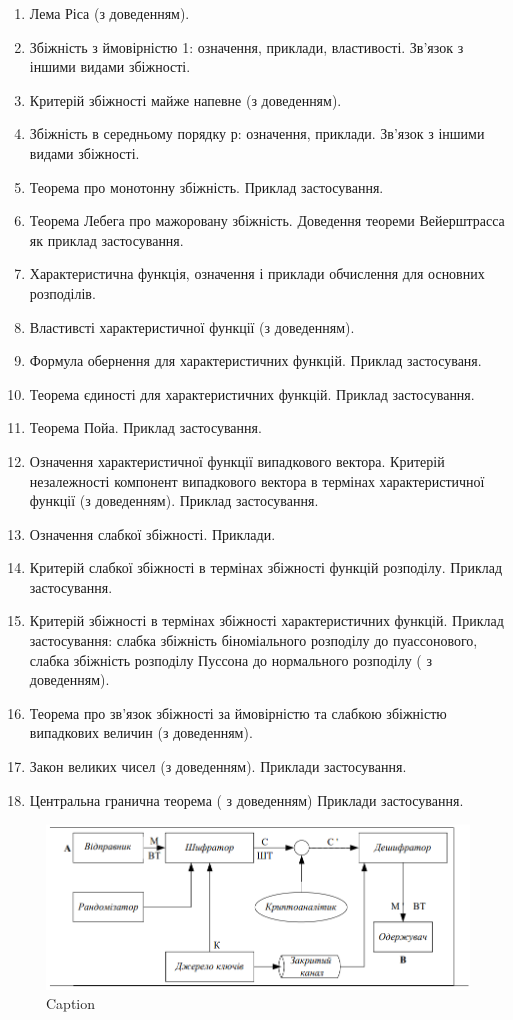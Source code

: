 \begin{enumerate}
    \item Лема Ріса (з доведенням).
    \item Збіжність з ймовірністю 1: означення, приклади, властивості. Зв'язок з іншими
        видами збіжності.
    \item Критерій збіжності майже напевне (з доведенням).
    \item Збіжність в середньому порядку р: означення, приклади. Зв'язок з іншими видами
        збіжності.
    \item Теорема про монотонну збіжність. Приклад застосування.
    \item Теорема Лебега про мажоровану збіжність. Доведення теореми Вейерштрасса як
        приклад застосування.
    \item Характеристична функція, означення і приклади обчислення для основних
        розподілів.
    \item Властивсті характеристичної функції (з доведенням).
    \item Формула обернення для характеристичних функцій. Приклад застосуваня.
    \item Теорема єдиності для характеристичних функцій. Приклад застосування.
    \item Теорема Пойа. Приклад застосування.
    \item Означення характеристичної функції випадкового вектора. Критерій
        незалежності компонент випадкового вектора в термінах характеристичної
        функції (з доведенням). Приклад застосування.
    \item Означення слабкої збіжності. Приклади.
    \item Критерій слабкої збіжності в термінах збіжності функцій розподілу. Приклад
        застосування.
    \item Критерій збіжності в термінах збіжності характеристичних функцій. Приклад
        застосування: слабка збіжність біноміального розподілу до пуассонового, слабка
        збіжність розподілу Пуссона до нормального розподілу ( з доведенням).
    \item Теорема про зв'язок збіжності за ймовірністю та слабкою збіжністю випадкових
        величин (з доведенням).
    \item Закон великих чисел (з доведенням). Приклади застосування.
    \item Центральна гранична теорема ( з доведенням) Приклади застосування. 
\end{enumerate}


\begin{figure}
    \centering
    \includegraphics[width=0.8\linewidth]{Images/Secret_comunication_general_scheme.png}
    \caption{Caption}
    \label{fig:enter-label}
\end{figure}


















